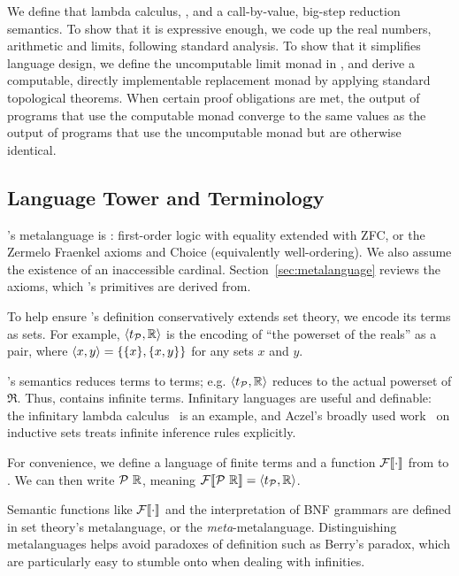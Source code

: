 We define that lambda calculus, \targetlang, and a call-by-value, big-step reduction semantics. To show that it is expressive enough, we code up the real numbers, arithmetic and limits, following standard analysis. To show that it simplifies language design, we define the uncomputable limit monad in \targetlang, and derive a computable, directly implementable replacement monad by applying standard topological theorems. When certain proof obligations are met, the output of programs that use the computable monad converge to the same values as the output of programs that use the uncomputable monad but are otherwise identical.

\subsection{Language Tower and Terminology}

\targetlang's metalanguage is : first-order logic with equality extended with ZFC, or the Zermelo Fraenkel axioms and Choice (equivalently well-ordering). We also assume the existence of an inaccessible cardinal. Section~\ref{sec:metalanguage} reviews the axioms, which \targetlang's primitives are derived from.

To help ensure \targetlang's definition conservatively extends set theory, we encode its terms as sets. For example, $\langle{t_{\mathcal{P}},\mathbb{R}}\rangle$ is the encoding of ``the powerset of the reals'' as a pair, where $\langle{x,y}\rangle = \{{\{{x}\},\{{x,y}\}}\}$ for any sets $x$ and $y$.

\targetlang's semantics reduces terms to terms; e.g. $\langle{t_{\mathcal{P}},\mathbb{R}}\rangle$ reduces to the actual powerset of $\Re$.
Thus, \targetlang contains infinite terms.
Infinitary languages are useful and definable: the infinitary lambda calculus~\cite{cit:kennaway-1996-inf-lc} is an example, and Aczel's broadly used work~\cite{cit:aczel-1977-inductive} on inductive sets treats infinite inference rules explicitly.

For convenience, we define a language \ftargetlang of finite terms and a function $\mathcal{F}\!\left\llbracket{\cdot}\right\rrbracket$ from \ftargetlang to \targetlang. We can then write $\mathcal{P}~\mathbb{R}$, meaning $\mathcal{F}\!\left\llbracket{\mathcal{P}~\mathbb{R}}\right\rrbracket = \langle{t_{\mathcal{P}},\mathbb{R}}\rangle$.

Semantic functions like $\mathcal{F}\!\left\llbracket{\cdot}\right\rrbracket$ and the interpretation of BNF grammars are defined in set theory's metalanguage, or the \emph{meta}-metalanguage.
Distinguishing metalanguages helps avoid paradoxes of definition such as Berry's paradox, which are particularly easy to stumble onto when dealing with infinities.

